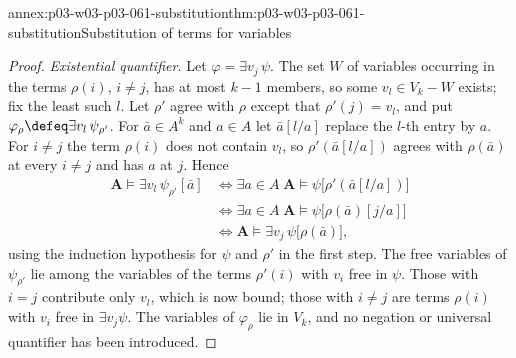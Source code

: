 \begin{annexitem}{annex:p03-w03-p03-061-substitution}{thm:p03-w03-p03-061-substitution}{Substitution of terms for variables}
\begin{proof}
\emph{Existential quantifier.} Let \(\varphi=\exists v_j\,\psi\). The set
\(W\) of variables occurring in the terms \(\rho(i)\), \(i\neq j\), has at
most \(k-1\) members, so some \(v_l\in V_k-W\) exists; fix the least such
\(l\). Let \(\rho'\) agree with \(\rho\) except that \(\rho'(j)=v_l\), and
put \(\varphi_\rho\defeq\exists v_l\,\psi_{\rho'}\). For \(\bar a\in A^k\)
and \(a\in A\) let \(\bar a[l/a]\) replace the \(l\)-th entry by \(a\). For
\(i\neq j\) the term \(\rho(i)\) does not contain \(v_l\), so
\(\rho'(\bar a[l/a])\) agrees with \(\rho(\bar a)\) at every \(i\neq j\) and
has \(a\) at \(j\). Hence
\[
\begin{aligned}
 \mathbf A\models\exists v_l\,\psi_{\rho'}[\bar a]
 &\iff\exists a\in A\;\mathbf A\models\psi\bigl[\rho'(\bar a[l/a])\bigr]\\
 &\iff\exists a\in A\;\mathbf A\models\psi\bigl[\rho(\bar a)[j/a]\bigr]\\
 &\iff\mathbf A\models\exists v_j\,\psi\bigl[\rho(\bar a)\bigr],
\end{aligned}
\]
using the induction hypothesis for \(\psi\) and \(\rho'\) in the first step.
The free variables of \(\psi_{\rho'}\) lie among the variables of the terms
\(\rho'(i)\) with \(v_i\) free in \(\psi\). Those with \(i=j\) contribute only
\(v_l\), which is now bound; those with \(i\neq j\) are terms \(\rho(i)\)
with \(v_i\) free in \(\exists v_j\psi\). The variables of
\(\varphi_\rho\) lie in \(V_k\), and no negation or universal quantifier has
been introduced.
\end{proof}
\end{annexitem}


